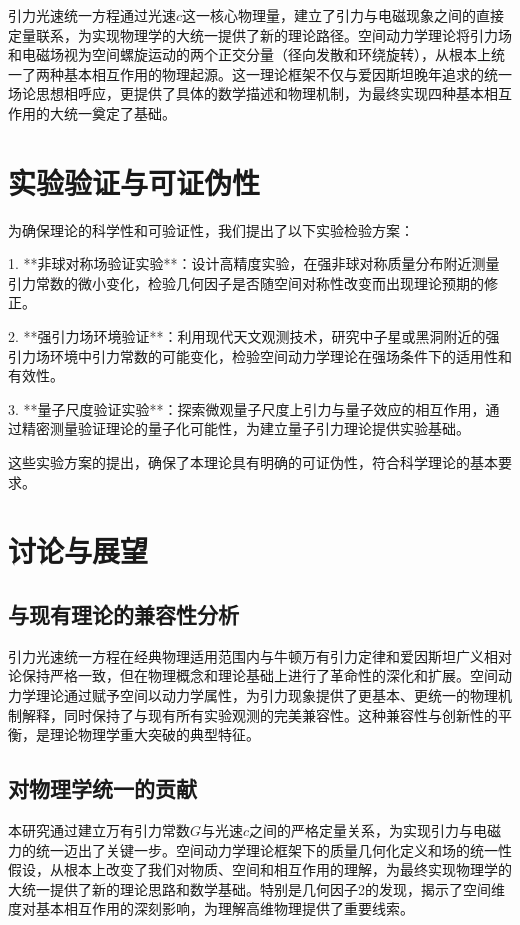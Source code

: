 \documentclass[12pt,twocolumn]{ctexart}
\begin{document}
引力光速统一方程通过光速$c$这一核心物理量，建立了引力与电磁现象之间的直接定量联系，为实现物理学的大统一提供了新的理论路径。空间动力学理论将引力场和电磁场视为空间螺旋运动的两个正交分量（径向发散和环绕旋转），从根本上统一了两种基本相互作用的物理起源。这一理论框架不仅与爱因斯坦晚年追求的统一场论思想相呼应，更提供了具体的数学描述和物理机制，为最终实现四种基本相互作用的大统一奠定了基础。

\section{实验验证与可证伪性}

为确保理论的科学性和可验证性，我们提出了以下实验检验方案：

1. **非球对称场验证实验**：设计高精度实验，在强非球对称质量分布附近测量引力常数的微小变化，检验几何因子是否随空间对称性改变而出现理论预期的修正。

2. **强引力场环境验证**：利用现代天文观测技术，研究中子星或黑洞附近的强引力场环境中引力常数的可能变化，检验空间动力学理论在强场条件下的适用性和有效性。

3. **量子尺度验证实验**：探索微观量子尺度上引力与量子效应的相互作用，通过精密测量验证理论的量子化可能性，为建立量子引力理论提供实验基础。

这些实验方案的提出，确保了本理论具有明确的可证伪性，符合科学理论的基本要求。

\section{讨论与展望}

\subsection{与现有理论的兼容性分析}

引力光速统一方程在经典物理适用范围内与牛顿万有引力定律和爱因斯坦广义相对论保持严格一致，但在物理概念和理论基础上进行了革命性的深化和扩展。空间动力学理论通过赋予空间以动力学属性，为引力现象提供了更基本、更统一的物理机制解释，同时保持了与现有所有实验观测的完美兼容性。这种兼容性与创新性的平衡，是理论物理学重大突破的典型特征。

\subsection{对物理学统一的贡献}

本研究通过建立万有引力常数$G$与光速$c$之间的严格定量关系，为实现引力与电磁力的统一迈出了关键一步。空间动力学理论框架下的质量几何化定义和场的统一性假设，从根本上改变了我们对物质、空间和相互作用的理解，为最终实现物理学的大统一提供了新的理论思路和数学基础。特别是几何因子2的发现，揭示了空间维度对基本相互作用的深刻影响，为理解高维物理提供了重要线索。
\end{document}
